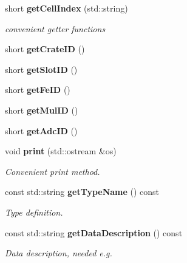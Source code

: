 \begin{DoxyCompactItemize}
\item 
short {\bf getCellIndex} (std::string)\label{classCALICE_1_1CellMappingHcal_a4beaa39635a9c718ecbcb98ee336bf4e}

\begin{DoxyCompactList}\small\item\em convenient getter functions \item\end{DoxyCompactList}\item 
short {\bfseries getCrateID} ()\label{classCALICE_1_1CellMappingHcal_a5828458b37828b0bf81007b081bdefdc}

\item 
short {\bfseries getSlotID} ()\label{classCALICE_1_1CellMappingHcal_a83ae95e889acadd9e666421021fc94bd}

\item 
short {\bfseries getFeID} ()\label{classCALICE_1_1CellMappingHcal_a0a0f4e3978887fcb96c2990ad98c7ff8}

\item 
short {\bfseries getMulID} ()\label{classCALICE_1_1CellMappingHcal_ac15468dcd4948f44a67978680748aa54}

\item 
short {\bfseries getAdcID} ()\label{classCALICE_1_1CellMappingHcal_a877867886306a01fe319eab0b00f7256}

\item 
void {\bf print} (std::ostream \&os)\label{classCALICE_1_1CellMappingHcal_a2ffe99f7db6ac95b8e972b37d189f6da}

\begin{DoxyCompactList}\small\item\em Convenient print method. \item\end{DoxyCompactList}\item 
const std::string {\bf getTypeName} () const \label{classCALICE_1_1CellMappingHcal_a03e821c39e5e6452c89954ddcc5038c8}

\begin{DoxyCompactList}\small\item\em Type definition. \item\end{DoxyCompactList}\item 
const std::string {\bf getDataDescription} () const 
\begin{DoxyCompactList}\small\item\em Data description, needed e.g. \item\end{DoxyCompactList}\end{DoxyCompactItemize}

